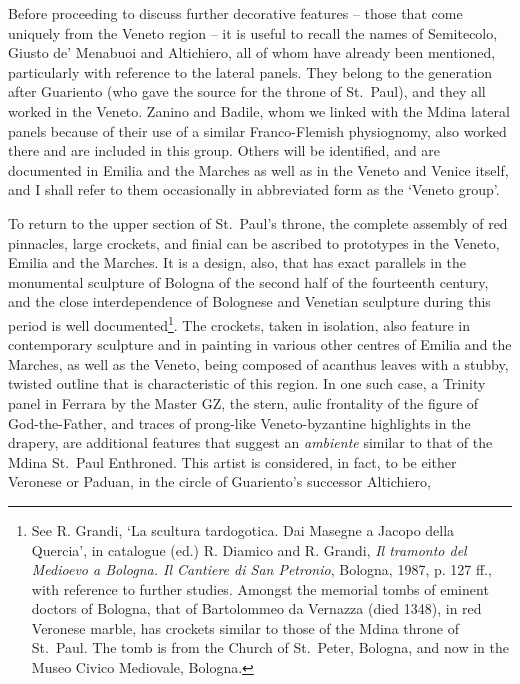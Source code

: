 \documentclass[a4paper,12pt]{article}
\begin{document}
Before proceeding to discuss further decorative features -- those that
come uniquely from the Veneto region -- it is useful to recall the
names of Semitecolo, Giusto de' Menabuoi and Altichiero, all of whom
have already been mentioned, particularly with reference to the
lateral panels. They belong to the generation after Guariento (who
gave the source for the throne of St.~Paul), and they all worked in
the Veneto. Zanino and Badile, whom we linked with the Mdina lateral
panels because of their use of a similar Franco-Flemish physiognomy,
also worked there and are included in this group. Others will be
identified, and are documented in Emilia and the Marches as well as in
the Veneto and Venice itself, and I shall refer to them occasionally
in abbreviated form as the `Veneto group'.

To return to the upper section of St.~Paul's throne, the complete
assembly of red pinnacles, large crockets, and finial can be ascribed
to prototypes in the Veneto, Emilia and the Marches. It is a design,
also, that has exact parallels in the monumental sculpture of Bologna
of the second half of the fourteenth century, and the close
interdependence of Bolognese and Venetian sculpture during this period
is well documented\footnote{See R. Grandi, `La scultura
tardogotica. Dai Masegne a Jacopo della Quercia', in catalogue (ed.)
R. Diamico and R. Grandi, \textit{Il tramonto del Medioevo a
Bologna. Il Cantiere di San Petronio}, Bologna, 1987, p. 127 ff., with
reference to further studies.  Amongst the memorial tombs of eminent
doctors of Bologna, that of Bartolommeo da Vernazza (died 1348), in
red Veronese marble, has crockets similar to those of the Mdina throne
of St.~Paul. The tomb is from the Church of St.~Peter, Bologna, and
now in the Museo Civico Mediovale, Bologna.}. The crockets, taken in
isolation, also feature in contemporary sculpture and in painting in
various other centres of Emilia and the Marches, as well as the
Veneto, being composed of acanthus leaves with a stubby, twisted
outline that is characteristic of this region.  In one such case, a
Trinity panel in Ferrara by the Master GZ, the stern, aulic frontality
of the figure of God-the-Father, and traces of prong-like
Veneto-byzantine highlights in the drapery, are additional features
that suggest an \textit{ambiente} similar to that of the Mdina
St.~Paul Enthroned.  This artist is considered, in fact, to be either
Veronese or Paduan, in the circle of Guariento's successor Altichiero,
\end{document}
